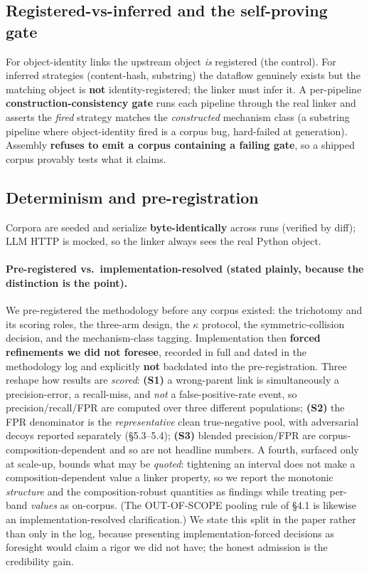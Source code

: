 \documentclass[11pt]{article}
\begin{document}
\subsection{Registered-vs-inferred and the self-proving gate}

For object-identity links the upstream object \emph{is} registered (the control). For inferred strategies
(content-hash, substring) the dataflow genuinely exists but the matching object is \textbf{not}
identity-registered; the linker must infer it. A per-pipeline \textbf{construction-consistency gate} runs
each pipeline through the real linker and asserts the \emph{fired} strategy matches the \emph{constructed}
mechanism class (a substring pipeline where object-identity fired is a corpus bug, hard-failed at
generation). Assembly \textbf{refuses to emit a corpus containing a failing gate}, so a shipped corpus
provably tests what it claims.

\subsection{Determinism and pre-registration}

Corpora are seeded and serialize \textbf{byte-identically} across runs (verified by diff); LLM HTTP is
mocked, so the linker always sees the real Python object.

\paragraph{Pre-registered vs.\ implementation-resolved (stated plainly, because the distinction is the
point).} We pre-registered the methodology before any corpus existed: the trichotomy and its scoring roles,
the three-arm design, the $\kappa$ protocol, the symmetric-collision decision, and the mechanism-class
tagging. Implementation then \textbf{forced refinements we did not foresee}, recorded in full and dated in
the methodology log and explicitly \textbf{not} backdated into the pre-registration. Three reshape how
results are \emph{scored}: \textbf{(S1)} a wrong-parent link is simultaneously a precision-error, a
recall-miss, and \emph{not} a false-positive-rate event, so precision/recall/FPR are computed over three
different populations; \textbf{(S2)} the FPR denominator is the \emph{representative} clean true-negative
pool, with adversarial decoys reported separately (\S5.3--5.4); \textbf{(S3)} blended precision/FPR are
corpus-composition-dependent and so are not headline numbers. A fourth, surfaced only at scale-up, bounds
what may be \emph{quoted}: tightening an interval does not make a composition-dependent value a linker
property, so we report the monotonic \emph{structure} and the composition-robust quantities as findings
while treating per-band \emph{values} as on-corpus. (The OUT-OF-SCOPE pooling rule of \S4.1 is likewise an
implementation-resolved clarification.) We state this split in the paper rather than only in the log,
because presenting implementation-forced decisions as foresight would claim a rigor we did not have; the
honest admission is the credibility gain.
\end{document}
